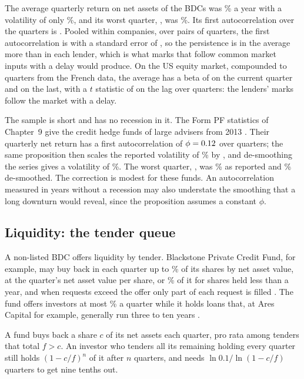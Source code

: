 \begin{chapterrefs}
 The average quarterly return on net assets of the BDCs was \dlRoeMean\% a year with a
volatility of only \dlRoeVol\%, and its worst quarter, \dlRoeMinQ, was \dlRoeMin\%. Its first
autocorrelation over the \dlRoeN{} quarters is \dlRhoEw. Pooled within companies, over \dlRhoN{} pairs of
quarters, the first autocorrelation is \dlRho{} with a standard error of \dlRhoSe, so the persistence is
in the average more than in each lender, which is what marks that follow common market inputs with a
delay would produce. On the US equity market,
compounded to quarters from the French data, the average has a beta of \dlBetaZero{} on the current
quarter and \dlBetaOne{} on the last, with a $t$ statistic of \dlBetaOneT{} on the lag over \dlDimN{}
quarters: the lenders' marks follow the market with a delay.

The sample is short and has no recession in it. The Form PF statistics of Chapter~9 give the credit
hedge funds of large advisers from 2013 \parencite{ofrhfm}. Their quarterly net return has a first
autocorrelation of $\phi=0.12$ over \dlPfN{} quarters; the same proposition then scales the reported
volatility of \dlPfVol\% by \dlPfRatio, and de-smoothing the series gives a volatility of \dlPfVolDs\%.
The worst quarter, \dlPfMinQ, was \dlPfMin\% as reported and \dlPfMinDs\% de-smoothed. The correction is
modest for these funds. An autocorrelation measured in years without a recession may also understate the
smoothing that a long downturn would reveal, since the proposition assumes a constant $\phi$.

\subsection{Liquidity: the tender queue}

A non-listed BDC offers liquidity by tender. Blackstone Private Credit Fund, for example, may buy back
in each quarter up to \dlCap\% of its shares by net asset value, at the quarter's net asset value per
share, or \dlEarly\% of it for shares held less than a year, and when requests exceed the offer only part
of each request is filled \parencite{bcred2025}. The fund offers investors at most \dlCap\% a quarter while
it holds loans that, at Ares Capital for example, generally run three to ten years \parencite{arcc2025}.

\begin{proposition}\label{prop6:tender}
A fund buys back a share $c$ of its net assets each quarter, pro rata among tenders that total $f>c$. An
investor who tenders all its remaining holding every quarter still holds $(1-c/f)^n$ of it after $n$
quarters, and needs $\ln 0.1/\ln(1-c/f)$ quarters to get nine tenths out.
\end{proposition}


\end{chapterrefs}
